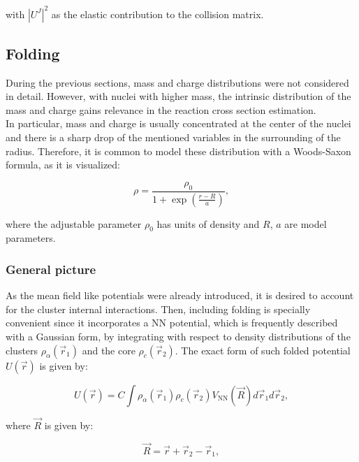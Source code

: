 \documentclass[openany]{book}
\begin{document}
with $ |U^{J}|^2$ as the elastic contribution to the collision matrix.


\subsection{Folding} \label{sub:potential_folding}

During the previous sections, mass and charge distributions were not considered in detail. However, with nuclei with higher mass, the intrinsic distribution of the mass and charge gains relevance in the reaction cross section estimation. \\

In particular, mass and charge is usually concentrated at the center of the nuclei and there is a sharp drop of the mentioned variables in the surrounding of the radius. Therefore, it is common to model these distribution with a Woods-Saxon formula, as it is visualized: 

\begin{equation}
	\rho = \frac{\rho_0}{1 + \exp{ \left( \frac{r - R}{a}  \right)}},
\end{equation}

where the adjustable parameter $\rho_0$ has units of density and $R$, $a$ are model parameters. \\

\subsubsection{General picture}

As the mean field like potentials were already introduced, it is desired to account for the cluster internal interactions. Then, including folding is specially convenient since it incorporates a $\mathrm{NN}$ potential, which is frequently described with a Gaussian form, by integrating with respect to density distributions of the clusters $\rho_\alpha(\vec r_1)$ and the core  $\rho_c(\vec r_2)$. The exact form of such folded potential $U(\vec r)$ is given by:

\begin{equation}\label{eq:micro_doubleFolding_potential}
	U(\vec r) = C \int { \rho_\alpha(\vec r_1) \rho_c (\vec r_2) V_{\mathrm{NN}} (\vec R) d\vec r_1 d\vec r_2},
\end{equation}

where $\vec R$ is given by:

\begin{equation}\label{eq:micro_doubleFolding_potential_separationVector}
	\vec R = \vec r + \vec r_2 - \vec r_1,
\end{equation}
\end{document}
